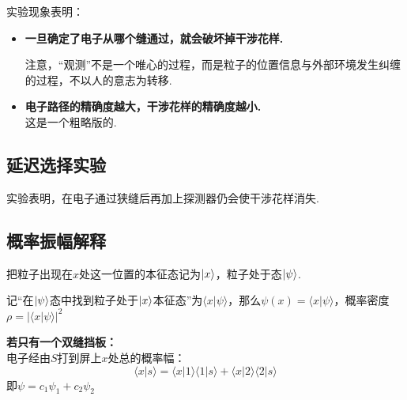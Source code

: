 实验现象表明：

\begin{itemize}
\item \textbf{一旦确定了电子从哪个缝通过，就会破坏掉干涉花样.}
    \begin{mistake}
        注意，“观测”不是一个唯心的过程，而是粒子的位置信息与外部环境发生纠缠的过程，不以人的意志为转移.
    \end{mistake}
\item \textbf{电子路径的精确度越大，干涉花样的精确度越小.} \\
这是一个粗略版的.
\end{itemize}

\subsection{延迟选择实验}
实验表明，在电子通过狭缝后再加上探测器仍会使干涉花样消失.

\subsection{概率振幅解释}
把粒子出现在$x$处这一位置的本征态记为$\ket{x}$，粒子处于态$\ket{\psi}$.

记“在$\ket{\psi}$态中找到粒子处于$\ket{x}$本征态”为$\langle x | \psi \rangle$，那么$\psi(x) = \langle x | \psi \rangle$，概率密度$\rho = |\langle x | \psi \rangle|^2$

\begin{minipage}[t]{0.35\textwidth} %
    \vspace{0pt} %
\end{minipage}
\begin{minipage}[t]{0.5\textwidth} %
    \vspace{0pt}
    \textbf{若只有一个双缝挡板：}\\
    电子经由$S$打到屏上$x$处总的概率幅：
    \[\langle x|s \rangle = \langle x|1 \rangle \langle 1|s \rangle + \langle x|2 \rangle \langle 2|s \rangle\]
    即$\psi = c_1 \psi_1 + c_2 \psi_2$
\end{minipage}

